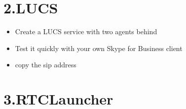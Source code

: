 \documentclass{article}
\begin{document}
\section{2.\hspace*{0.5em}LUCS}\label{sec-lucs}%

\begin{itemize}[noitemsep,topsep=\mdcompacttopsep]%

\item{}Create a LUCS service with two agents behind%

\item{}Test it quickly with your own Skype for Business client%

\item{}copy the sip address%
\end{itemize}%

\section{3.\hspace*{0.5em}RTCLauncher}\label{sec-rtclauncher}%
\end{document}
